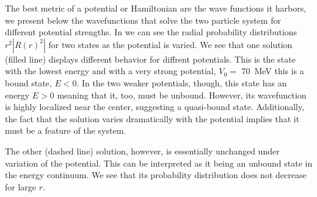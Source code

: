 \documentclass[../main/report.tex]{subfiles}
\begin{document}
The best metric of a potential or Hamiltonian are the wave functions it harbors, we present below the wavefunctions that solve the two particle system for different potential strengths.
In  we can see the radial probability distributions $r^2|R(r)^2|$ for two states as the potential is varied.
 We see that one solution (filled line) displays different behavior for diffrent potentials.
 This is the state with the lowest energy and with a very strong potential, $V_0 =$ \SI{70}{MeV} this is a bound state, $E<0$. 
In the two weaker potentials, though, this state has an energy $E>0$ meaning that it, too, must be unbound. 
However, its wavefunction is highly localized near the center, suggesting a quasi-bound state. 
Additionally, the fact that the solution varies dramatically with the potential implies that it must be a feature of the system.
 
The other (dashed line) solution, however, is essentially unchanged under variation of the potential. 
This can be interpreted as it being an unbound state in the energy continuum. We see that its probability distribution does not decrease for large $r$. 




\end{document}
